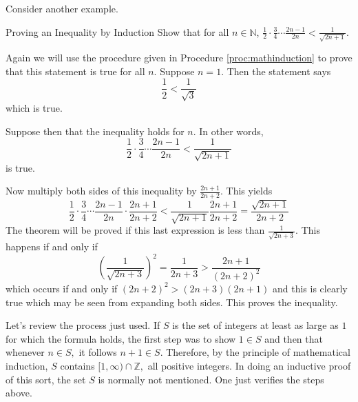 Consider another example.

\begin{example}{Proving an Inequality by Induction}\label{exa:inequalityproofbyinduction}
Show that for all $n\in \mathbb{N}$, $\displaystyle \frac{1}{2}\cdot 
\displaystyle \frac{3}{4}\cdots \displaystyle \frac{2n-1}{2n}<\displaystyle
\frac{1}{\sqrt{2n+1}}.$
\end{example}

\begin{solution}
Again we will use the procedure given in Procedure \ref{proc:mathinduction} to prove that this statement is true for all $n$.
Suppose $n=1$. Then the statement says 
\begin{equation*}
\frac{1}{2}< \frac{1}{\sqrt{3}}
\end{equation*}
 which is true. 

Suppose then that
the inequality holds for $n.$ In other words, 
\begin{equation*}
 \frac{1}{2}\cdot \frac{3}{4}\cdots \frac{2n-1}{2n} < \frac{1}{\sqrt{2n+1}}
\end{equation*}
is true.

Now multiply both sides of this inequality by $\frac{2n+1}{2n+2}$.
This yields
\begin{equation*}
\frac{1}{2}\cdot \frac{3}{4}\cdots \frac{2n-1}{2n}\cdot \frac{2n+1}{2n+2}<
\frac{1}{\sqrt{2n+1}}\frac{2n+1}{2n+2}=\frac{\sqrt{2n+1}}{2n+2}
\end{equation*}
The theorem will be proved if this last expression is less than $
\displaystyle\frac{1}{\sqrt{2n+3}}.$ This happens if and only if
\begin{equation*}
\left( \frac{1}{\sqrt{2n+3}}\right) ^{2}=\frac{1}{2n+3}>\frac{2n+1}{\left(
2n+2\right) ^{2}}
\end{equation*}
which occurs if and only if $\left( 2n+2\right) ^{2}>\left( 2n+3\right)
\left( 2n+1\right) $ and this is clearly true which may be seen from
expanding both sides. This proves the inequality.
\end{solution}

Let's review the process just used. If $S$ is the set of integers at least as
large as $1$ for which the formula holds, the first step was to show $1\in S$
and then that whenever $n\in S,$ it follows $n+1\in S.$ Therefore, by the
principle of mathematical induction, $S$ contains $[1,\infty )\cap \mathbb{Z}
,$ all positive integers. In doing an inductive proof of this sort, the set $
S$ is normally not mentioned. One just verifies the steps above. 